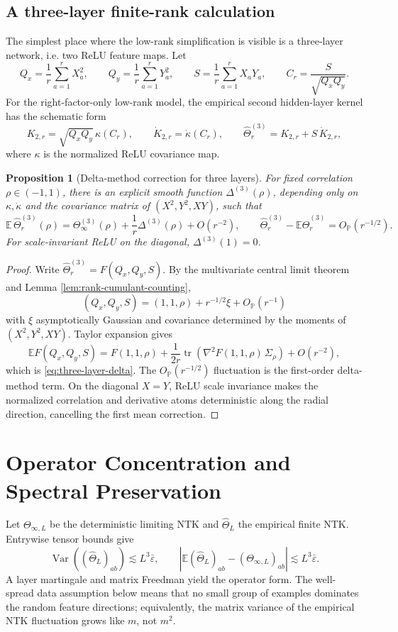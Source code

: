 \documentclass{article}
\newtheorem{proposition}[theorem]{Proposition}
\newcommand{\E}{\mathbb E}
\newcommand{\Pp}{\mathbb P}
\newcommand{\Var}{\operatorname{Var}}
\newcommand{\tr}{\operatorname{tr}}
\newcommand{\wh}{\widehat}
\newcommand{\barE}{\bar\varepsilon}
\begin{document}
\subsection{A three-layer finite-rank calculation}
The simplest place where the low-rank simplification is visible is a three-layer network, i.e. two ReLU feature maps. Let
\[
Q_x=\frac1r\sum_{a=1}^{r}X_a^2,\qquad
Q_y=\frac1r\sum_{a=1}^{r}Y_a^2,\qquad
S=\frac1r\sum_{a=1}^{r}X_aY_a,
\qquad
C_r=\frac{S}{\sqrt{Q_xQ_y}}.
\]
For the right-factor-only low-rank model, the empirical second hidden-layer kernel has the schematic form
\[
K_{2,r}=\sqrt{Q_xQ_y}\,\kappa(C_r),
\qquad
\dot K_{2,r}=\dot\kappa(C_r),
\qquad
\wh\Theta^{(3)}_r=K_{2,r}+S\,\dot K_{2,r},
\]
where \(\kappa\) is the normalized ReLU covariance map.

\begin{proposition}[Delta-method correction for three layers]
\label{prop:three-layer-delta}
For fixed correlation \(\rho\in(-1,1)\), there is an explicit smooth function \(\Delta^{(3)}(\rho)\), depending only on \(\kappa,\dot\kappa\) and the covariance matrix of \((X^2,Y^2,XY)\), such that
\begin{equation}
\E\,\wh\Theta^{(3)}_r(\rho)
=\Theta^{(3)}_\infty(\rho)+\frac1r\Delta^{(3)}(\rho)+O(r^{-2}),
\qquad
\wh\Theta^{(3)}_r-\E\wh\Theta^{(3)}_r=O_{\Pp}(r^{-1/2}).
\label{eq:three-layer-delta}
\end{equation}
For scale-invariant ReLU on the diagonal, \(\Delta^{(3)}(1)=0\).
\end{proposition}

\begin{proof}
Write \(\wh\Theta^{(3)}_r=F(Q_x,Q_y,S)\). By the multivariate central limit theorem and Lemma \ref{lem:rank-cumulant-counting},
\[
(Q_x,Q_y,S)=(1,1,\rho)+r^{-1/2}\xi+O_{\Pp}(r^{-1})
\]
with \(\xi\) asymptotically Gaussian and covariance determined by the moments of \((X^2,Y^2,XY)\). Taylor expansion gives
\[
\E F(Q_x,Q_y,S)
=F(1,1,\rho)+\frac1{2r}\tr\left(\nabla^2F(1,1,\rho)\,\Sigma_\rho\right)+O(r^{-2}),
\]
which is \eqref{eq:three-layer-delta}. The \(O_{\Pp}(r^{-1/2})\) fluctuation is the first-order delta-method term. On the diagonal \(X=Y\), ReLU scale invariance makes the normalized correlation and derivative atoms deterministic along the radial direction, cancelling the first mean correction.
\end{proof}

\section{Operator Concentration and Spectral Preservation}
Let \(\Theta_{\infty,L}\) be the deterministic limiting NTK and \(\wh\Theta_L\) the empirical finite NTK. Entrywise tensor bounds give
\begin{equation}
\Var((\wh\Theta_L)_{ab})\lesssim L^3\barE,
\qquad
|\E(\wh\Theta_L)_{ab}-(\Theta_{\infty,L})_{ab}|\lesssim L^3\barE.
\end{equation}
A layer martingale and matrix Freedman yield the operator form. The well-spread data assumption below means that no small group of examples dominates the random feature directions; equivalently, the matrix variance of the empirical NTK fluctuation grows like \(m\), not \(m^2\).
\end{document}
